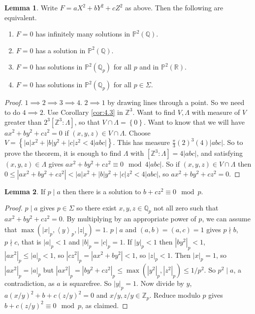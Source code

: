 \documentclass{article}
\newcommand{\Z}{\mathbb{Z}}
\newcommand{\Q}{\mathbb{Q}}
\newcommand{\R}{\mathbb{R}}
\renewcommand{\P}{\mathbb{P}}
\newcommand{\rb}[1]{\left( #1 \right)}
\renewcommand{\sb}[1]{\left[ #1 \right]}
\newcommand{\cb}[1]{\left\{ #1 \right\}}
\newcommand{\ab}[1]{\left\langle #1 \right\rangle}
\newcommand{\abs}[1]{\left\lvert #1 \right\rvert}
\theoremstyle{definition}\newtheorem{definition}{Definition}[section]
\theoremstyle{definition}\newtheorem{remark}[definition]{Remark}
\theoremstyle{definition}\newtheorem*{example}{Example}
\theoremstyle{definition}\newtheorem*{note}{Note}
\newtheorem{lemma}[definition]{Lemma}
\begin{document}
\begin{lemma}
Write $ F = aX^2 + bY^2 + cZ^2 $ as above. Then the following are equivalent.
\begin{enumerate}
\item $ F = 0 $ has infinitely many solutions in $ \P^2\rb{\Q} $.
\item $ F = 0 $ has a solution in $ \P^2\rb{\Q} $.
\item $ F = 0 $ has solutions in $ \P^2\rb{\Q_p} $ for all $ p $ and in $ \P^2\rb{\R} $.
\item $ F = 0 $ has solutions in $ \P^2\rb{\Q_p} $ for all $ p \in \Sigma $.
\end{enumerate}
\end{lemma}

\begin{proof}
$ 1 \implies 2 \implies 3 \implies 4 $. $ 2 \implies 1 $ by drawing lines through a point. So we need to do $ 4 \implies 2 $. Use Corollary \ref{cor:4.3} in $ \Z^3 $. Want to find $ V, \Lambda $ with measure of $ V $ greater than $ 2^3\sb{\Z^3 : \Lambda} $, so that $ V \cap \Lambda = \cb{0} $. Want to know that we will have $ ax^2 + by^2 + cz^2 = 0 $ if $ \rb{x, y, z} \in V \cap \Lambda $. Choose $ V = \cb{\abs{a}x^2 + \abs{b}y^2 + \abs{c}z^2 < 4\abs{abc}} $. This has measure $ \tfrac{\pi}{3}\rb{2}^3\rb{4}\abs{abc} $. So to prove the theorem, it is enough to find $ \Lambda $ with $ \sb{\Z^3 : \Lambda} = 4\abs{abc} $, and satisfying $ \rb{x, y, z} \in \Lambda $ gives $ ax^2 + by^2 + cz^2 \equiv 0 \mod 4\abs{abc} $. So if $ \rb{x, y, z} \in V \cap \Lambda $ then $ 0 \le \abs{ax^2 + by^2 + cz^2} < \abs{a}x^2 + \abs{b}y^2 + \abs{c}z^2 < 4\abs{abc} $, so $ ax^2 + by^2 + cz^2 = 0 $.
\end{proof}


\begin{lemma}
If $ p \mid a $ then there is a solution to $ b + cz^2 \equiv 0 \mod p $.
\end{lemma}

\begin{proof}
$ p \mid a $ gives $ p \in \Sigma $ so there exist $ x, y, z \in \Q_p $ not all zero such that $ ax^2 + by^2 + cz^2 = 0 $. By multiplying by an appropriate power of $ p $, we can assume that $ \max\rb{\abs{x}_p, \ab{y}_p, \abs{z}_p} = 1 $. $ p \mid a $ and $ \rb{a, b} = \rb{a, c} = 1 $ gives $ p \nmid b $, $ p \nmid c $, that is $ \abs{a}_p < 1 $ and $ \abs{b}_p = \abs{c}_p = 1 $. If $ \abs{y}_p < 1 $ then $ \abs{by^2}_p < 1 $, $ \abs{ax^2}_p \le \abs{a}_p < 1 $, so $ \abs{cz^2}_p = \abs{ax^2 + by^2} < 1 $, so $ \abs{z}_p < 1 $. Then $ \abs{x}_p = 1 $, so $ \abs{ax^2}_p = \abs{a}_p $ but $ \abs{ax^2}_p = \abs{by^2 + cz^2}_p \le \max\rb{\abs{y^2}_p, \abs{z^2}_p} \le 1 / p^2 $. So $ p^2 \mid a $, a contradiction, as $ a $ is squarefree. So $ \abs{y}_p = 1 $. Now divide by $ y $, $ a\rb{x / y}^2 + b + c\rb{z / y}^2 = 0 $ and $ x / y, z / y \in \Z_p $. Reduce modulo $ p $ gives $ b + c\rb{z / y}^2 \equiv 0 \mod p $, as claimed.
\end{proof}
\end{document}
